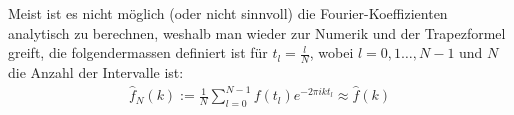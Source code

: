 \inlineremark Meist ist es nicht möglich (oder nicht sinnvoll) die Fourier-Koeffizienten analytisch zu berechnen,
weshalb man wieder zur Numerik und der Trapezformel greift, die folgendermassen definiert ist für $t_l = \frac{l}{N}$,
wobei $l = 0, 1 \ldots, N - 1$ und $N$ die Anzahl der Intervalle ist:
\begin{align*}
    \hat{f}_N(k) := \frac{1}{N} \sum_{l = 0}^{N - 1} f(t_l) e^{-2\pi ikt_l} \approx \hat{f}(k)
\end{align*}



